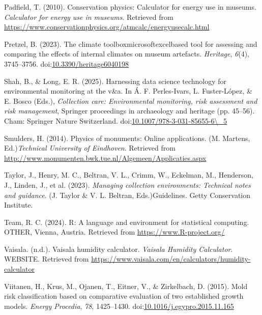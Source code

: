 \documentclass[
]{article}
\newlength{\cslhangindent}
\newenvironment{CSLReferences}[2] %
 {\begin{list}{}{%
  \setlength{\itemindent}{0pt}
  \setlength{\leftmargin}{0pt}
  \setlength{\parsep}{0pt}
  \ifodd #1
   \setlength{\leftmargin}{\cslhangindent}
   \setlength{\itemindent}{-1\cslhangindent}
  \fi
  \setlength{\itemsep}{#2\baselineskip}}}
 {\end{list}}
\begin{document}
\begin{CSLReferences}{1}{0}
Padfield, T. (2010). Conservation physics: Calculator for energy use in
museums. \emph{Calculator for energy use in museums}. Retrieved from
\url{https://www.conservationphysics.org/atmcalc/energyusecalc.html}

Pretzel, B. (2023). The climate
toolbox\textemdasha microsoft\textregistered excel\textregistered based
tool for assessing and comparing the effects of internal climates on
museum artefacts. \emph{Heritage}, \emph{6}(4), 3745--3756.
doi:\href{https://doi.org/10.3390/heritage6040198}{10.3390/heritage6040198}

Shah, B., \& Long, E. R. (2025). Harnessing data science technology for
environmental monitoring at the v\&a. In Á. F. Perles-Ivars, L.
Fuster-López, \& E. Bosco (Eds.), \emph{Collection care: Environmental
monitoring, risk assessment and risk management}, Springer proceedings
in archaeology and heritage (pp. 45--56). Cham: Springer Nature
Switzerland.
doi:\href{https://doi.org/10.1007/978-3-031-85655-6/_5}{10.1007/978-3-031-85655-6\textbackslash\_5}

Smulders, H. (2014). Physics of monuments: Online applications. (M.
Martens, Ed.)\emph{Technical University of Eindhoven}. Retrieved from
\url{http://www.monumenten.bwk.tue.nl/Algemeen/Applicaties.aspx}

Taylor, J., Henry, M. C., Beltran, V. L., Crimm, W., Eckelman, M.,
Henderson, J., Linden, J., et al. (2023). \emph{Managing collection
environments: Technical notes and guidance}. (J. Taylor \& V. L.
Beltran, Eds.)Guidelines. Getty Conservation Institute.

Team, R. C. (2024). R: A language and environment for statistical
computing. OTHER, Vienna, Austria. Retrieved from
\url{https://www.R-project.org/}

Vaisala. (n.d.). Vaisala humidity calculator. \emph{Vaisala Humidity
Calculator}. WEBSITE. Retrieved from
\url{https://www.vaisala.com/en/calculators/humidity-calculator}

Viitanen, H., Krus, M., Ojanen, T., Eitner, V., \& Zirkelbach, D.
(2015). Mold risk classification based on comparative evaluation of two
established growth models. \emph{Energy Procedia}, \emph{78},
1425--1430.
doi:\href{https://doi.org/10.1016/j.egypro.2015.11.165}{10.1016/j.egypro.2015.11.165}


\end{CSLReferences}
\end{document}

